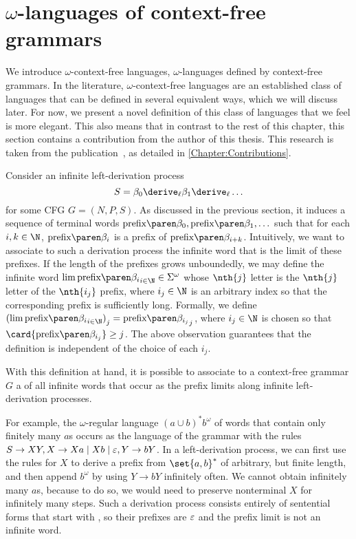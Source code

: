 \documentclass[../../diss.tex]{subfiles}
\begin{document}
\section{\texorpdfstring{$\omega$}{Omega}-languages of context-free grammars}%
\label{Section:CFGOmega}%

We introduce $\omega$-context-free languages, $\omega$-languages defined by context-free grammars.
In the literature, $\omega$-context-free languages are an established class of languages that can be defined in several equivalent ways, which we will discuss later.
For now, we present a novel definition of this class of languages that we feel is more elegant.
This also means that in contrast to the rest of this chapter, this section contains a contribution from the author of this thesis.
This research is taken from the publication~\cite{MeyerMN17a}, as detailed in \cref{Chapter:Contributions}.

Consider an infinite left-derivation process
\[
    S = \beta_0 \leftderive \beta_1 \leftderive \ldots
\]
for some CFG $G = (N, P, S)$.
As discussed in the previous section, it induces a sequence of terminal words
\(
    \tprefix{\beta_0}, \tprefix{\beta_1}, \ldots
\)
such that for each $i,k \in \N$, $\tprefix{\beta_i}$ is a prefix of $\tprefix{\beta_{i+k}}$.
Intuitively, we want to associate to such a derivation process the infinite word that is the limit of these prefixes.
If the length of the prefixes grows unboundedly, we may define the infinite word
\(
    \lim \tprefix{\beta_i}_{i \in \N} \in \Sigma^\omega
\)
whose $\nth{j}$ letter is the $\nth{j}$ letter of the $\nth{i_j}$ prefix, where $i_j \in \N$ is an arbitrary index so that the corresponding prefix is sufficiently long.
Formally, we define ${(\lim \tprefix{\beta_i}_{i \in \N})}_j = \tprefix{\beta_{i_j}}_j$, where $i_j \in \N$ is chosen so that $\card{ \tprefix{\beta_{i_j}} } \geq j$.
The above observation guarantees that the definition is independent of the choice of each $i_j$.

With this definition at hand, it is possible to associate to a context-free grammar $G$ a  of all infinite words that occur as the prefix limits along infinite left-derivation processes.

For example, the $\omega$-regular language ${(a \cup b)}^* b^\omega$ of words that contain only finitely many $a$s occurs as the language of the grammar with the rules $S \to XY, X \to Xa \mid Xb \mid \varepsilon, Y \to bY$.
In a left-derivation process, we can first use the rules for $X$ to derive a prefix from $\set{a,b}^*$ of arbitrary, but finite length, and then append $b^\omega$ by using $Y \to bY$ infinitely often.
We cannot obtain infinitely many $a$s, because to do so, we would need to preserve nonterminal $X$ for infinitely many steps.
Such a derivation process consists entirely of sentential forms that start with , so their prefixes are $\varepsilon$ and the prefix limit is not an infinite word.
\end{document}
